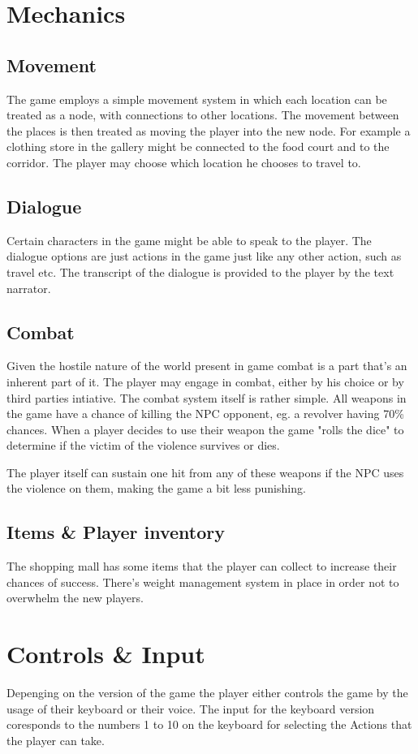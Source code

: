 \section{Mechanics}

\subsection{Movement}
The game employs a simple movement system in which each location can be treated as a node, 
with connections to other locations. The movement between the places is then treated as moving 
the player into the new node.
For example a clothing store in the gallery might be connected to the food court and to the corridor.
The player may choose which location he chooses to travel to.


\subsection{Dialogue}
Certain characters in the game might be able to speak to the player. The dialogue options are just actions in the 
game just like any other action, such as travel etc. 
The transcript of the dialogue is provided to the player by the text narrator.

\subsection{Combat}
Given the hostile nature of the world present in game combat is a part that's an inherent part of it. 
The player may engage in combat, either by his choice or by third parties intiative. The combat system itself
is rather simple. All weapons in the game have a chance of killing the NPC opponent, eg. a revolver having 70\% chances. 
When a player decides to use their weapon the game "rolls the dice" to determine if the victim of the violence
survives or dies. 


The player itself can sustain one hit from any of these weapons if the NPC uses the violence on them, making the game a 
bit less punishing.

\subsection{Items \& Player inventory}

The shopping mall has some items that the player can collect to increase their chances of success. There's weight management
system in place in order not to overwhelm the new players.

\section{Controls \& Input}

Depenging on the version of the game the player either controls the game by the usage of their keyboard or their voice. 
The input for the keyboard version coresponds to the numbers 1 to 10 on the keyboard for selecting the Actions that 
the player can take.


